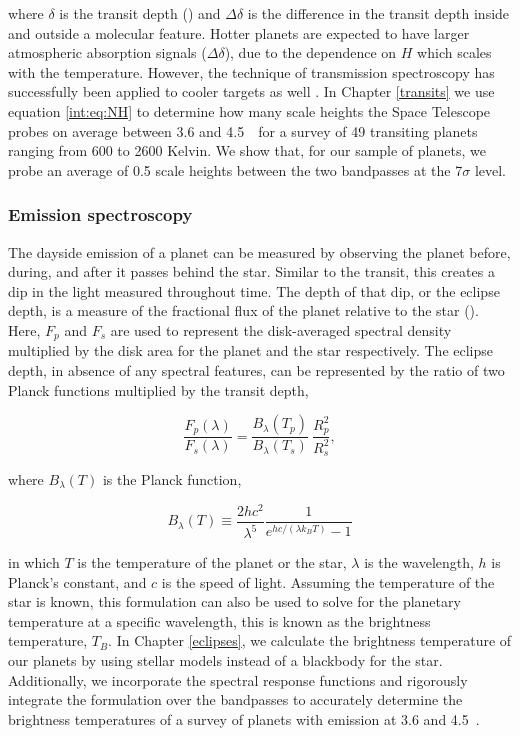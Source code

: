 where $\delta$ is the transit depth (\rprss) and $\Delta\delta$ is the difference in the transit depth inside and outside a molecular feature. Hotter planets are expected to have larger atmospheric absorption signals ($\Delta\delta$), due to the dependence on $H$ which scales with the temperature. However, the technique of transmission spectroscopy has successfully been applied to cooler targets as well \citep[e.g.,][]{Desert2011b, Berta2012, Crossfield2017}. In Chapter \ref{transits} we use equation \ref{int:eq:NH} to determine how many scale heights the \spitzer Space Telescope probes on average between 3.6 and 4.5~\um~for a survey of 49 transiting planets ranging from 600 to 2600 Kelvin. %
We show that, for our sample of planets, we probe an average of 0.5 scale heights between the two \spitzerIRAC bandpasses at the 7$\sigma$ level.

\subsubsection{Emission spectroscopy}

The dayside emission of a planet can be measured by observing the planet before, during, and after it passes behind the star. Similar to the transit, this creates a dip in the light measured throughout time. The depth of that dip, or the eclipse depth, is a measure of the fractional flux of the planet relative to the star (\fpfs). Here, $F_p$ and $F_s$ are used to represent the disk-averaged spectral density multiplied by the disk area for the planet and the star respectively. The eclipse depth, in absence of any spectral features, can be represented by the ratio of two Planck functions multiplied by the transit depth,

\begin{equation}
\frac{F_p(\lambda)}{F_s(\lambda)} = \frac{B_\lambda(T_p)}{B_\lambda(T_s)}~\frac{R_p^2}{R_s^2},
\end{equation}

where $B_\lambda(T)$ is the Planck function,

\begin{equation}
B_\lambda(T) \equiv \frac{2hc^2}{\lambda^5} \frac{1}{e^{hc/(\lambda k_B T)} - 1}
\end{equation}

in which $T$ is the temperature of the planet or the star, $\lambda$ is the wavelength, $h$ is Planck's constant, and $c$ is the speed of light. Assuming the temperature of the star is known, this formulation can also be used to solve for the planetary temperature at a specific wavelength, this is known as the brightness temperature, $T_B$. In Chapter \ref{eclipses}, we calculate the brightness temperature of our planets by using stellar models instead of a blackbody for the star. Additionally, we incorporate the \spitzer spectral response functions and rigorously integrate the formulation over the bandpasses to accurately determine the brightness temperatures of a survey of planets with emission at 3.6 and 4.5~\um.

